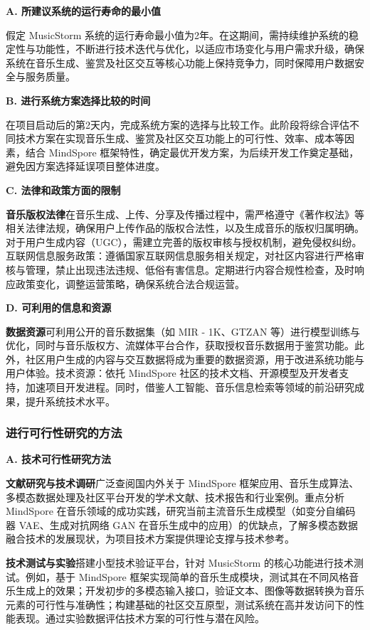 \documentclass{base}
\numberwithin{figure}{section} %
\begin{document}
\textbf{A. 所建议系统的运行寿命的最小值​}

假定 MusicStorm 系统的运行寿命最小值为2年。在这期间，需持续维护系统的稳定性与功能性，不断进行技术迭代与优化，以适应市场变化与用户需求升级，确保系统在音乐生成、鉴赏及社区交互等核心功能上保持竞争力，同时保障用户数据安全与服务质量。

\textbf{B. 进行系统方案选择比较的时间​}

在项目启动后的第2天内，完成系统方案的选择与比较工作。此阶段将综合评估不同技术方案在实现音乐生成、鉴赏及社区交互功能上的可行性、效率、成本等因素，结合 MindSpore 框架特性，确定最优开发方案，为后续开发工作奠定基础，避免因方案选择延误项目整体进度。

\textbf{C. 法律和政策方面的限制​}

\textbf{音乐版权法律}\quad 在音乐生成、上传、分享及传播过程中，需严格遵守《著作权法》等相关法律法规，确保用户上传作品的版权合法性，以及生成音乐的版权归属明确。对于用户生成内容（UGC），需建立完善的版权审核与授权机制，避免侵权纠纷。​
互联网信息服务政策：遵循国家互联网信息服务相关规定，对社区内容进行严格审核与管理，禁止出现违法违规、低俗有害信息。定期进行内容合规性检查，及时响应政策变化，调整运营策略，确保系统合法合规运营。

\textbf{D. 可利用的信息和资源​}

\textbf{数据资源}\quad 可利用公开的音乐数据集（如 MIR - 1K、GTZAN 等）进行模型训练与优化，同时与音乐版权方、流媒体平台合作，获取授权音乐数据用于鉴赏功能。此外，社区用户生成的内容与交互数据将成为重要的数据资源，用于改进系统功能与用户体验。​
技术资源：依托 MindSpore 社区的技术文档、开源模型及开发者支持，加速项目开发进程。同时，借鉴人工智能、音乐信息检索等领域的前沿研究成果，提升系统技术水平。

\subsubsection{进行可行性研究的方法}

\textbf{A. 技术可行性研究方法​}

\textbf{文献研究与技术调研}\quad 广泛查阅国内外关于 MindSpore 框架应用、音乐生成算法、多模态数据处理及社区平台开发的学术文献、技术报告和行业案例。重点分析 MindSpore 在音乐领域的成功实践，研究当前主流音乐生成模型（如变分自编码器 VAE、生成对抗网络 GAN 在音乐生成中的应用）的优缺点，了解多模态数据融合技术的发展现状，为项目技术方案提供理论支撑与技术参考。​

\textbf{技术测试与实验}\quad 搭建小型技术验证平台，针对 MusicStorm 的核心功能进行技术测试。例如，基于 MindSpore 框架实现简单的音乐生成模块，测试其在不同风格音乐生成上的效果；开发初步的多模态输入接口，验证文本、图像等数据转换为音乐元素的可行性与准确性；构建基础的社区交互原型，测试系统在高并发访问下的性能表现。通过实验数据评估技术方案的可行性与潜在风险。
\end{document}

